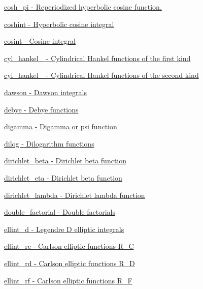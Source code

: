 \begin{DoxyItemize}
\item \hyperlink{group__mathsf__gnu_gaf59c68a01adfdab0f22c4fb405ab2a36}{cosh\+\_\+pi -\/ Reperiodized hyperbolic cosine function.}
\item \hyperlink{group__mathsf__gnu_ga2411d513d418180285ace6650c7b7e31}{coshint -\/ Hyperbolic cosine integral}
\item \hyperlink{group__mathsf__gnu_gafd398869cde057087e6b3428a1d13a93}{cosint -\/ Cosine integral}
\item \hyperlink{group__mathsf__gnu_ga5329bba77d10a9d2f15d9bbe43a70db3}{cyl\+\_\+hankel\+\_ -\/ Cylindrical Hankel functions of the first kind}
\item \hyperlink{group__mathsf__gnu_ga7ebc71dd48ac97255d72f5f5f43dfd8e}{cyl\+\_\+hankel\+\_ -\/ Cylindrical Hankel functions of the second kind}
\item \hyperlink{group__mathsf__gnu_gabc97cbc04fdd23593e8dccbc1421dad5}{dawson -\/ Dawson integrals}
\item \hyperlink{group__mathsf__gnu_ga0b14de47c011de3ebf771c9f29b2b78c}{debye -\/ Debye functions}
\item \hyperlink{group__mathsf__gnu_ga7b87300edf8754d959e1d94fe0c9246e}{digamma -\/ Digamma or psi function}
\item \hyperlink{group__mathsf__gnu_ga4185ee1a0f9189a18085f65d52b6bc9b}{dilog -\/ Dilogarithm functions}
\item \hyperlink{group__mathsf__gnu_ga87466a2d429a2815d794acc21c882b08}{dirichlet\+\_\+beta -\/ Dirichlet beta function}
\item \hyperlink{group__mathsf__gnu_gae46e26e4107675d285c79a2d6202e6c7}{dirichlet\+\_\+eta -\/ Dirichlet beta function}
\item \hyperlink{group__mathsf__gnu_ga06842a81bdcabf9c62252dde992d42ee}{dirichlet\+\_\+lambda -\/ Dirichlet lambda function}
\item \hyperlink{group__mathsf__gnu_ga1e62c47f84f9782828f8830b4fedc13c}{double\+\_\+factorial -\/ Double factorials}
\item \hyperlink{group__mathsf__gnu_gad75103894786e6d7766bac4d8447b6cc}{ellint\+\_\+d -\/ Legendre D elliptic integrals}
\item \hyperlink{group__mathsf__gnu_ga7d3d42f5f71a74266be8aaca528056bf}{ellint\+\_\+rc -\/ Carlson elliptic functions R\+\_\+C}
\item \hyperlink{group__mathsf__gnu_gad29dae6abc783c8fe952dba477e65309}{ellint\+\_\+rd -\/ Carlson elliptic functions R\+\_\+D}
\item \hyperlink{group__mathsf__gnu_gae4859494464c7eaf98193f92b2235bc1}{ellint\+\_\+rf -\/ Carlson elliptic functions R\+\_\+F}

\end{DoxyItemize}
